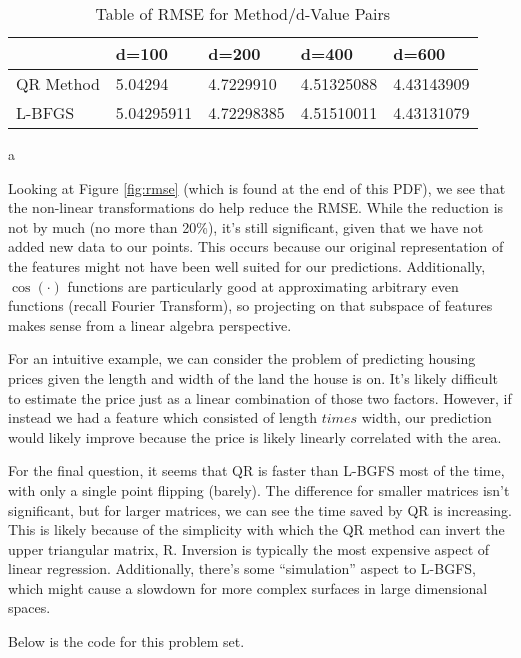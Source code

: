 \documentclass[submit]{harvardml}
\theoremstyle{plain}
\begin{document}
\begin{table}[h!]
\centering
\caption{Table of RMSE for Method/d-Value Pairs}
\label{my-label}
\begin{tabular}{|l|l|l|l|l|}
\hline
          & d=100      & d=200      & d=400      & d=600      \\ \hline
QR Method & 5.04294    & 4.7229910  & 4.51325088 & 4.43143909 \\ \hline
L-BFGS    & 5.04295911 & 4.72298385 & 4.51510011 & 4.43131079 \\ \hline
\end{tabular}a
\end{table}
Looking at Figure \ref{fig:rmse} (which is found at the end of this PDF), we see that the non-linear transformations do help reduce the RMSE. While the reduction is not by much (no more than 20\%), it's still significant, given that we have not added new data to our points. This occurs because our original representation of the features might not have been well suited for our predictions. Additionally, $\cos(\cdot)$ functions are particularly good at approximating arbitrary even functions (recall Fourier Transform), so projecting on that subspace of features makes sense from a linear algebra perspective.

For an intuitive example, we can consider the problem of predicting housing prices given the length and width of the land the house is on. It's likely difficult to estimate the price just as a linear combination of those two factors. However, if instead we had a feature which consisted of length $
times$ width, our prediction would likely improve because the price is likely linearly correlated with the area.

For the final question, it seems that QR is faster than L-BGFS most of the time, with only a single point flipping (barely). The difference for smaller matrices isn't significant, but for larger matrices, we can see the time saved by QR is increasing. This is likely because of the simplicity with which the QR method can invert the upper triangular matrix, R. Inversion is typically the most expensive aspect of linear regression. Additionally, there's some ``simulation'' aspect to L-BGFS, which might cause a slowdown for more complex surfaces in large dimensional spaces.

Below is the code for this problem set.

\end{document}
